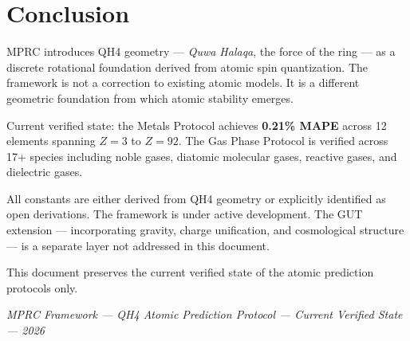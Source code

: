 \documentclass[12pt,a4paper]{article}
\theoremstyle{definition}
\begin{document}
\section*{Conclusion}

MPRC introduces QH4 geometry --- \textit{Quwa Halaqa}, the force of the ring --- as a discrete rotational foundation derived from atomic spin quantization. The framework is not a correction to existing atomic models. It is a different geometric foundation from which atomic stability emerges.

Current verified state: the Metals Protocol achieves \textbf{0.21\% MAPE} across 12 elements spanning $Z=3$ to $Z=92$. The Gas Phase Protocol is verified across 17+ species including noble gases, diatomic molecular gases, reactive gases, and dielectric gases.

All constants are either derived from QH4 geometry or explicitly identified as open derivations. The framework is under active development. The GUT extension --- incorporating gravity, charge unification, and cosmological structure --- is a separate layer not addressed in this document.

This document preserves the current verified state of the atomic prediction protocols only.

\bigskip
\begin{center}
\textit{MPRC Framework --- QH4 Atomic Prediction Protocol --- Current Verified State --- 2026}
\end{center}
\end{document}
